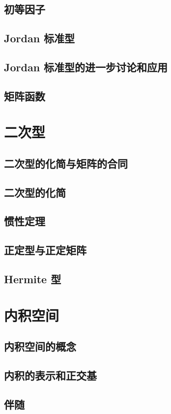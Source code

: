 \documentclass[a4paper, 11pt]{ctexbook}
\begin{document}
        \section{初等因子}
        \section{Jordan 标准型}
        \section{Jordan 标准型的进一步讨论和应用}
        \section{矩阵函数}
    \chapter{二次型}
        \section{二次型的化简与矩阵的合同}
        \section{二次型的化简}
        \section{惯性定理}
        \section{正定型与正定矩阵}
        \section{Hermite 型}
    \chapter{内积空间}
        \section{内积空间的概念}
        \section{内积的表示和正交基}
        \section{伴随}
\end{document}
